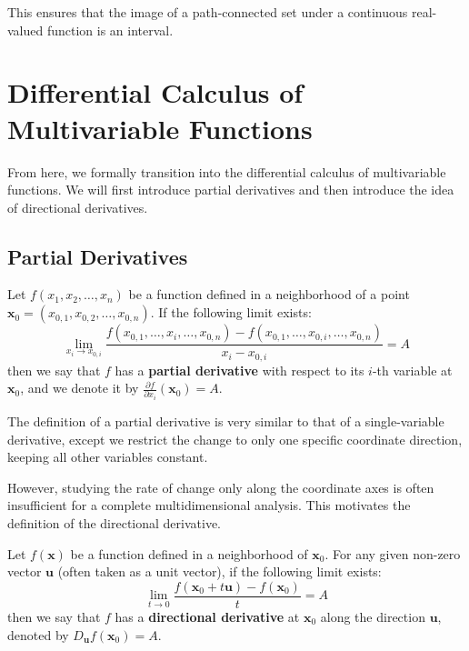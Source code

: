 This ensures that the image of a path-connected set under a continuous real-valued function is an interval.

\section{Differential Calculus of Multivariable Functions}

From here, we formally transition into the differential calculus of multivariable functions. We will first introduce partial derivatives and then introduce the idea of directional derivatives.

\subsection{Partial Derivatives}

\begin{definition}
Let $f(x_1, x_2, \dots, x_n)$ be a function defined in a neighborhood of a point $\mathbf{x}_0 = (x_{0,1}, x_{0,2}, \dots, x_{0,n})$. If the following limit exists:
\[ \lim_{x_i \to x_{0,i}} \frac{f(x_{0,1}, \dots, x_i, \dots, x_{0,n}) - f(x_{0,1}, \dots, x_{0,i}, \dots, x_{0,n})}{x_i - x_{0,i}} = A \]
then we say that $f$ has a \textbf{partial derivative} with respect to its $i$-th variable at $\mathbf{x}_0$, and we denote it by $\frac{\partial f}{\partial x_i}(\mathbf{x}_0) = A$.
\end{definition}

The definition of a partial derivative is very similar to that of a single-variable derivative, except we restrict the change to only one specific coordinate direction, keeping all other variables constant.

However, studying the rate of change only along the coordinate axes is often insufficient for a complete multidimensional analysis. This motivates the definition of the directional derivative.

\newpage

\begin{definition}
Let $f(\mathbf{x})$ be a function defined in a neighborhood of $\mathbf{x}_0$. For any given non-zero vector $\mathbf{u}$ (often taken as a unit vector), if the following limit exists:
\[ \lim_{t \to 0} \frac{f(\mathbf{x}_0 + t\mathbf{u}) - f(\mathbf{x}_0)}{t} = A \]
then we say that $f$ has a \textbf{directional derivative} at $\mathbf{x}_0$ along the direction $\mathbf{u}$, denoted by $D_{\mathbf{u}} f(\mathbf{x}_0) = A$.
\end{definition}
